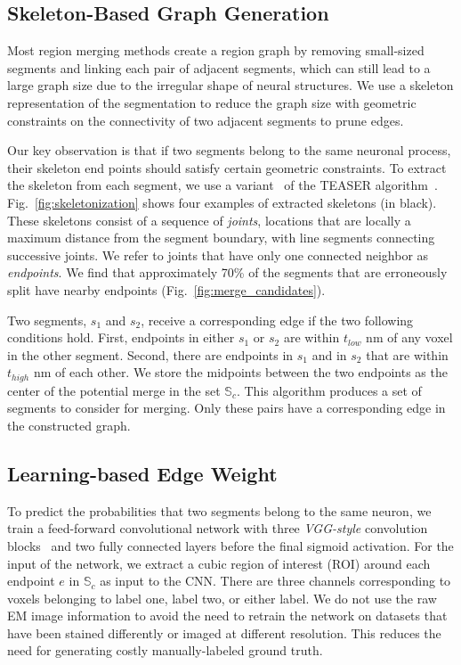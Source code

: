 \subsection{Skeleton-Based Graph Generation}
\label{sec:skeletonization}
Most region merging methods create a region graph by removing small-sized segments and linking each pair of adjacent segments, which can still lead to a large graph size due to the irregular shape of neural structures.
We use a skeleton representation of the segmentation to reduce the graph size with geometric constraints on the connectivity of two adjacent segments to prune edges.

Our key observation is that if two segments belong to the same neuronal process, their skeleton end points should satisfy certain geometric constraints.
To extract the skeleton from each segment, we use a variant~\cite{zhao2014automatic} of the TEASER algorithm~\cite{sato2000teasar}. 
Fig.~\ref{fig:skeletonization} shows four examples of extracted skeletons (in black). 
These skeletons consist of a sequence of \textit{joints}, locations that are locally a maximum distance from the segment boundary, with line segments connecting successive joints. 
We refer to joints that have only one connected neighbor as \textit{endpoints}. 
We find that approximately 70\% of the segments that are erroneously split have nearby endpoints (Fig.~\ref{fig:merge_candidates}). 

Two segments, $s_1$ and $s_2$, receive a corresponding edge if the two following conditions hold.
First, endpoints in either $s_1$ or $s_2$ are within $t_{low}$ nm of any voxel in the other segment.
Second, there are endpoints in $s_1$ and in $s_2$ that are within $t_{high}$ nm of each other.
We store the midpoints between the two endpoints as the center of the potential merge in the set $\mathbb{S}_c$. 
This algorithm produces a set of segments to consider for merging. 
Only these pairs have a corresponding edge in the constructed graph.

\subsection{Learning-based Edge Weight}
\label{sec:edge-weights}

To predict the probabilities that two segments belong to the same neuron, we train a feed-forward convolutional network with three \textit{VGG-style} convolution blocks~\cite{chatfield2014return} and two fully connected layers before the final sigmoid activation. 
For the input of the network, we extract a cubic region of interest (ROI) around each endpoint $e$ in $\mathbb{S}_c$ as input to the CNN. 
There are three channels corresponding to voxels belonging to label one, label two, or either label.
We do not use the raw EM image information to avoid the need to retrain the network on datasets that have been stained differently or imaged at different resolution. 
This reduces the need for generating costly manually-labeled ground truth. 

